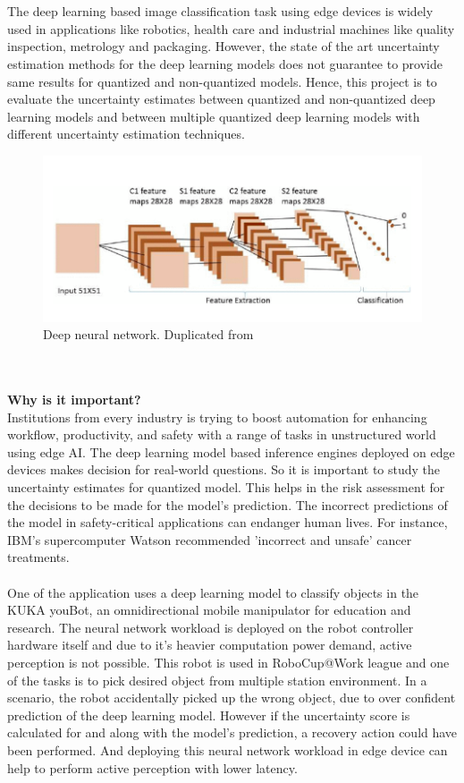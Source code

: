 \documentclass[rnd]{mas_proposal}
\begin{document}
\\\\
The deep learning based image classification task using edge devices is widely used in applications like robotics, health care and industrial machines like quality inspection, metrology and packaging. However, the state of the art uncertainty estimation methods for the deep learning models does not guarantee to provide same results for quantized and non-quantized models. Hence, this project is to evaluate the uncertainty estimates between quantized and non-quantized deep learning models and between multiple quantized deep learning models with different uncertainty estimation techniques.
\begin{figure}[h!]
    \includegraphics[width=\textwidth]{images/DNN.png}
    \caption{Deep neural network. Duplicated from \cite{DNN_Picture}}
    \label{fig:myfigure}
\end{figure}
\\\\
\textbf{Why is it important?} \\
Institutions from every industry is trying to boost automation for enhancing workflow, productivity, and safety with a range of tasks in unstructured world using edge AI. The deep learning model based inference engines deployed on edge devices makes decision for real-world questions. So it is important to study the uncertainty estimates for quantized model. This helps in the risk assessment for the decisions to be made for the model's prediction. The incorrect predictions of the model in safety-critical applications can endanger human lives. For instance, IBM's supercomputer Watson recommended 'incorrect and unsafe' cancer treatments\cite{ibm}. 
\\\\
One of the application uses a deep learning model to classify objects in the KUKA youBot\cite{bischoff2011kuka}, an omnidirectional mobile manipulator for education and research. The neural network workload is deployed on the robot controller hardware itself and due to it's heavier computation power demand, active perception is not possible. This robot is used in RoboCup@Work league and one of the tasks is to pick desired object from multiple station environment. In a scenario, the robot accidentally picked up the wrong object, due to over confident prediction of the deep learning model. However if the uncertainty score is calculated for and along with the model's prediction, a recovery action could have been performed. And deploying this neural network workload in edge device can help to perform active perception with lower latency.
\end{document}
